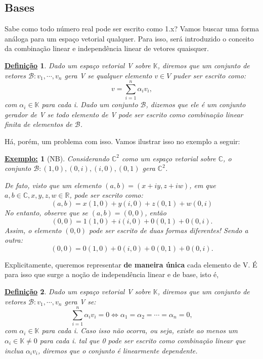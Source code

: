 \documentclass{article}
\newtheorem*{def*}{\underline{Defini\c c\~ao}}
\newtheorem{example}{\underline{Exemplo:}}[section]
\begin{document}
\subsection{Bases}
Sabe como todo n\'umero real pode ser escrito como 1.x? Vamos buscar uma forma an\'aloga para um espa\c co vetorial
qualquer. Para isso, ser\'a introduzido o conceito da combina\c c\~ao linear e independ\^encia linear de vetores quaisquer.

\begin{def*}
	Dado um  espa\c co vetorial V sobre $\mathbb{K}$, diremos que um conjunto de vetores $\mathcal{B}: v_1, \cdots{}, v_n$ gera V
	se qualquer elemento $v\in{V}$ puder ser escrito como:
	$$
		v = \sum_{i=1}^{n}\alpha_iv_i,
	$$
	com $\alpha_i\in\mathbb{K}$ para cada i. Dado um conjunto $\mathcal{B}$, dizemos que ele \'e um conjunto
	gerador de V se todo elemento de V pode ser escrito como combina\c c\~ao linear finita de elementos de
	$\mathcal{B}$.
\end{def*}
H\'a, por\'em, um problema com isso. Vamos ilustrar isso no exemplo a seguir:
\begin{example}[NB]
	\label{Not basis}
	Considerando $\mathbb{C}^2$ como um espa\c co vetorial sobre $\mathbb{C}$, o conjunto
	$\mathcal{B}: (1, 0), (0, i), (i, 0), (0, 1)$ gera $\mathbb{C}^2$.

	De fato, visto que um elemento $(a, b) = (x + iy, z + iw)$, em que $a, b\in\mathbb{C}, x, y, z, w\in\mathbb{R}$, pode ser escrito como:
	$$
		(a, b) = x(1, 0) + y(i, 0) + z(0, 1) + w(0, i)
	$$
	No entanto, observe que se $(a, b) = (0, 0)$, ent\~ao
	$$
		(0, 0) = 1(1, 0) + i(i, 0) + 0(0, 1) + 0(0, i).
	$$
	Assim, o elemento $(0, 0)$ pode ser escrito de duas formas diferentes! Sendo a outra:
	$$
		(0, 0) = 0(1, 0) + 0(i, 0) + 0(0, 1) + 0(0, i).
	$$
\end{example}
Explicitamente, queremos representar \textbf{de maneira \'unica} cada elemento de V. \'E para isso que surge
a no\c c\~ao de independ\^encia linear e de base, isto \'e,
\begin{def*}
	Dado um  espa\c co vetorial V sobre $\mathbb{K}$, diremos que um conjunto de vetores $\mathcal{B}: v_1, \cdots{}, v_n$ gera V
	se:
	$$
		\sum_{i=1}^{n}\alpha_iv_i = 0 \Leftrightarrow \alpha_1 = \alpha_2 = \cdots = \alpha_n = 0,
	$$
	com $\alpha_i\in\mathbb{K}$ para cada i. Caso isso n\~ao ocorra, ou seja, existe ao menos um $\alpha_i\in\mathbb{K}\neq{0}$ para cada i.
	tal que 0 pode ser escrito como combina\c c\~ao linear que inclua $\alpha_iv_i$, diremos que o conjunto \'e
	linearmente dependente.
\end{def*}
\end{document}
